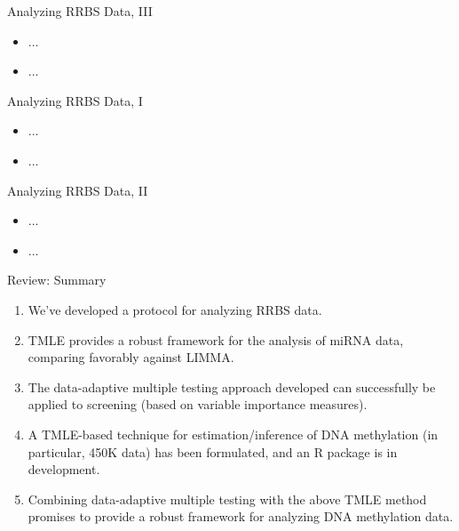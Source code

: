 \documentclass[12pt,t]{beamer}
\begin{document}
\begin{frame}[c]{Analyzing RRBS Data, III}

\begin{center}
\begin{itemize}
	\item ...
    \item ...
\end{itemize}
\end{center}

\note{}

\end{frame}


\begin{frame}[c]{Analyzing RRBS Data, I}

\begin{center}
\begin{itemize}
	\item ...
    \item ...
\end{itemize}
\end{center}

\note{}

\end{frame}


\begin{frame}[c]{Analyzing RRBS Data, II}

\begin{center}
\begin{itemize}
	\item ...
  \item ...
\end{itemize}
\end{center}

\note{}

\end{frame}


\begin{frame}[c]{Review: Summary}

  \begin{enumerate}
  	\itemsep12pt
  	\item We've developed a protocol for analyzing RRBS data.
  	\item TMLE provides a robust framework for the analysis of
          miRNA data, comparing favorably against LIMMA.
  	\item The data-adaptive multiple testing approach developed
          can successfully be applied to screening (based on
          variable importance measures).
  	\item A TMLE-based technique for estimation/inference of DNA
          methylation (in particular, 450K data) has been
          formulated, and an R package is in development.
  	\item Combining data-adaptive multiple testing with the above
    	  TMLE method promises to provide a robust framework for
          analyzing DNA methylation data.
  \end{enumerate}


\end{frame}
\end{document}
